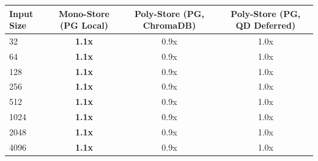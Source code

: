 \begin{tabular}{lccc}
\toprule
\textbf{Input Size} & \textbf{Mono-Store (PG Local)} & \textbf{Poly-Store (PG, ChromaDB)} & \textbf{Poly-Store (PG, QD Deferred)} \\
\midrule
32 & \textbf{1.1x} & 0.9x & 1.0x \\
64 & \textbf{1.1x} & 0.9x & 1.0x \\
128 & \textbf{1.1x} & 0.9x & 1.0x \\
256 & \textbf{1.1x} & 0.9x & 1.0x \\
512 & \textbf{1.1x} & 0.9x & 1.0x \\
1024 & \textbf{1.1x} & 0.9x & 1.0x \\
2048 & \textbf{1.1x} & 0.9x & 1.0x \\
4096 & \textbf{1.1x} & 0.9x & 1.0x \\
\bottomrule
\end{tabular}
